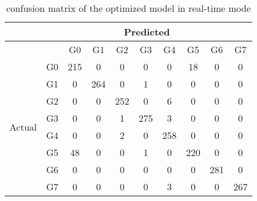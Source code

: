 \begin{longtable}{cccccccccc}
\caption{confusion matrix of the optimized model in real-time mode}
\label{tab:my-table}\\
\cline{2-10}
                        & \multicolumn{9}{c}{Predicted}                      \\ \cline{2-10} 
\endfirsthead
%
\endhead
%
                        &    & G0  & G1  & G2  & G3  & G4  & G5  & G6  & G7  \\ \hline
\multirow{8}{*}{Actual} & G0 & 215 & 0   & 0   & 0   & 0   & 18  & 0   & 0   \\ \cline{2-2}
                        & G1 & 0   & 264 & 0   & 1   & 0   & 0   & 0   & 0   \\ \cline{2-2}
                        & G2 & 0   & 0   & 252 & 0   & 6   & 0   & 0   & 0   \\ \cline{2-2}
                        & G3 & 0   & 0   & 1   & 275 & 3   & 0   & 0   & 0   \\ \cline{2-2}
                        & G4 & 0   & 0   & 2   & 0   & 258 & 0   & 0   & 0   \\ \cline{2-2}
                        & G5 & 48  & 0   & 0   & 1   & 0   & 220 & 0   & 0   \\ \cline{2-2}
                        & G6 & 0   & 0   & 0   & 0   & 0   & 0   & 281 & 0   \\ \cline{2-2}
                        & G7 & 0   & 0   & 0   & 0   & 3   & 0   & 0   & 267 \\ \hline
\end{longtable}